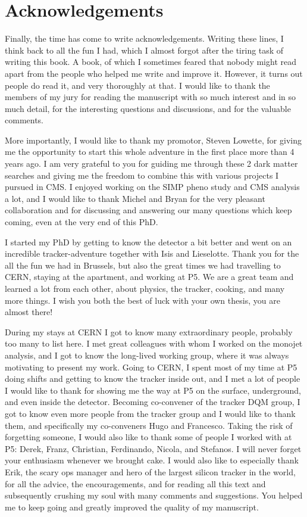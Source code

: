 
\chapter*{Acknowledgements}

Finally, the time has come to write acknowledgements. Writing these lines, I think back to all the fun I had, which I almost forgot after the tiring task of writing this book. A book, of which I sometimes feared that nobody might read apart from the people who helped me write and improve it. However, it turns out people do read it, and very thoroughly at that. I would like to thank the members of my jury for reading the manuscript with so much interest and in so much detail, for the interesting questions and discussions, and for the valuable comments.

More importantly, I would like to thank my promotor, Steven Lowette, for giving me the opportunity to start this whole adventure in the first place more than 4 years ago. I am very grateful to you for guiding me through these 2 dark matter searches and giving me the freedom to combine this with various projects I pursued in CMS. I enjoyed working on the SIMP pheno study and CMS analysis a lot, and I would like to thank Michel and Bryan for the very pleasant collaboration and for discussing and answering our many questions which keep coming, even at the very end of this PhD.

I started my PhD by getting to know the detector a bit better and went on an incredible tracker-adventure together with Isis and Lieselotte. Thank you for the all the fun we had in Brussels, but also the great times we had travelling to CERN, staying at the apartment, and working at P5. We are a great team and learned a lot from each other, about physics, the tracker, cooking, and many more things. I wish you both the best of luck with your own thesis, you are almost there!

During my stays at CERN I got to know many extraordinary people, probably too many to list here. I met great colleagues with whom I worked on the monojet analysis, and I got to know the long-lived working group, where it was always motivating to present my work. Going to CERN, I spent most of my time at P5 doing shifts and getting to know the tracker inside out, and I met a lot of people I would like to thank for showing me the way at P5 on the surface, underground, and even inside the detector. Becoming co-convener of the tracker DQM group, I got to know even more people from the tracker group and I would like to thank them, and specifically my co-conveners Hugo and Francesco. Taking the risk of forgetting someone, I would also like to thank some of people I worked with at P5: Derek, Franz, Christian, Ferdinando, Nicola, and Stefanos. I will never forget your enthusiasm whenever we brought cake. I would also like to especially thank Erik, the scary ops manager and hero of the largest silicon tracker in the world, for all the advice, the encouragements, and for reading all this text and subsequently crushing my soul with many comments and suggestions. You helped me to keep going and greatly improved the quality of my manuscript.

